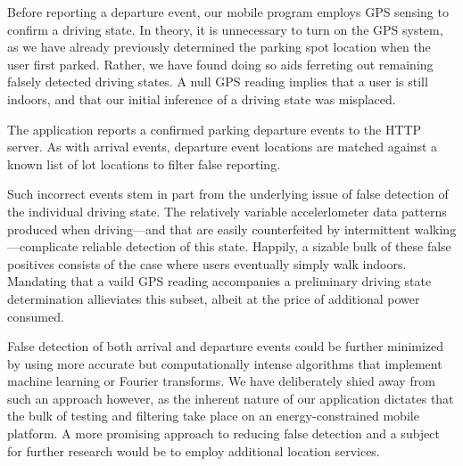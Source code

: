 Before reporting a departure event, our mobile program employs GPS sensing
to confirm a driving state.  In theory, it is unnecessary to turn on the
GPS system, as we have already previously determined the parking spot
location when the user first parked.  Rather, we have found doing so aids
ferreting out remaining falsely detected driving states.  A null GPS reading
implies that a user is still indoors, and that our initial inference of a
driving state was misplaced.

The application reports a confirmed parking departure events to the
HTTP server.  As with arrival events, departure event locations are matched
against a known list of lot locations to filter false reporting.

Such incorrect events stem in part from the underlying issue of false
detection of the individual driving state.  The relatively variable
accelerlometer data patterns produced when driving---and that are easily
counterfeited by intermittent walking---complicate reliable detection of this
state.  Happily, a sizable bulk of these false positives consists of the case
where users eventually simply walk indoors.  Mandating that a vaild GPS
reading accompanies a preliminary driving state determination allieviates this
subset, albeit at the price of additional power consumed.

False detection of both arrival and departure events could be further
minimized by using more accurate but computationally intense algorithms that
implement machine learning or Fourier transforms.  We have deliberately shied
away from such an approach however, as the inherent nature of our application
dictates that the bulk of testing and filtering take place on an
energy-constrained mobile platform.  A more promising approach to reducing
false detection and a subject for further research would be to employ
additional location services.







